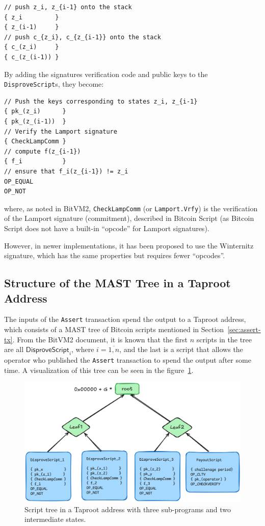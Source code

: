 \documentclass{iacrtrans}
\begin{document}
\begin{verbatim}
// push z_i, z_{i-1} onto the stack
{ z_i         }
{ z_(i-1)     }
// push c_{z_i}, c_{z_{i-1}} onto the stack
{ c_(z_i)     }
{ c_(z_(i-1)) }
\end{verbatim}

By adding the signatures verification code and public keys to the
\texttt{DisproveScript}s, they become:

\begin{verbatim}
// Push the keys corresponding to states z_i, z_{i-1}
{ pk_(z_i)      }
{ pk_(z_(i-1))  }
// Verify the Lamport signature
{ CheckLampComm }
// compute f(z_{i-1})
{ f_i           }
// ensure that f_i(z_{i-1}) != z_i
OP_EQUAL
OP_NOT
\end{verbatim}

where, as noted in BitVM2, \texttt{CheckLampComm} (or
\texttt{Lamport.Vrfy}) is the verification of the Lamport signature
(commitment), described in Bitcoin Script (as Bitcoin Script does not
have a built-in ``opcode'' for Lamport signatures).

However, in newer implementations, it has been proposed to use the
Winternitz signature, which has the same properties but requires fewer
``opcodes''.

\subsection{Structure of the MAST Tree in a Taproot
Address}\label{sec:mast-tree-structure}

The inputs of the \texttt{Assert} transaction spend the output to a
Taproot address, which consists of a MAST tree of Bitcoin scripts
mentioned in Section~\ref{sec:assert-tx}. From the BitVM2 document, it
is known that the first \(n\) scripts in the tree are all
\(\mathsf{DisproveScript}_i\), where \(i = \overline{1, n}\), and the last is a
script that allows the operator who published the \texttt{Assert}
transaction to spend the output after some time. A visualization of
this tree can be seen in the figure~\ref{fig:assert-tx-mast-tree}.

\begin{figure}[htbp]
  \centering
  \includegraphics[width=.9\linewidth]{../images/assert-tx-taproot-output.png}
  \caption{\label{fig:assert-tx-mast-tree}Script tree in a Taproot
  address with three sub-programs and two intermediate states.}
\end{figure}
\end{document}
